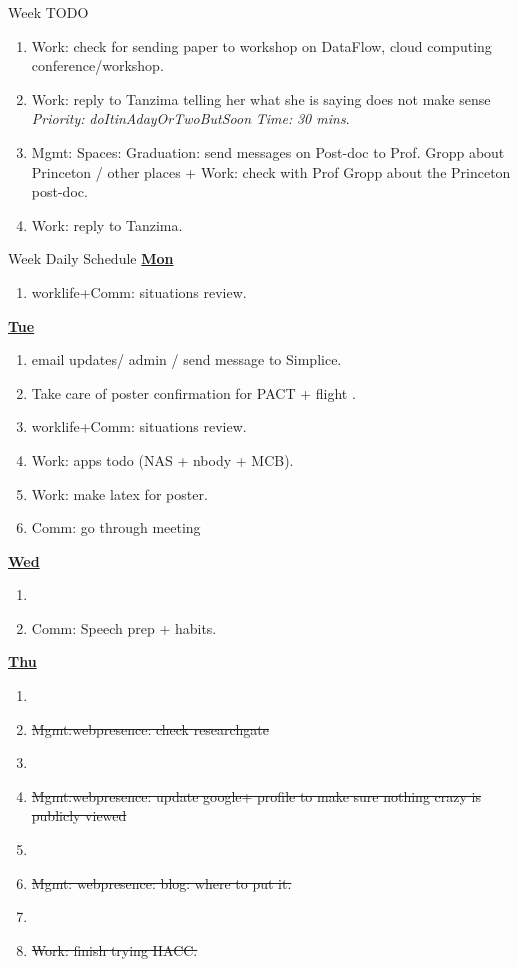 \documentclass[serif,mathserif,final]{beamer}
\newcommand{\doneTask}[1]{\item \sout{#1}}
\newcommand{\timeEst}[1]{\textit{Time:} \textit{#1}}
\newcommand{\priority}[1]{\textit{Priority:} \textit{#1}}
\begin{document}
\begin{frame}{}
\begin{columns}[t]
\begin{column}{0.50\linewidth}
\begin{block}{ Week TODO}
\begin{enumerate}
\item \tiny Work: check for sending paper to workshop on DataFlow,
  cloud computing conference/workshop. 
\item \tiny Work: reply to Tanzima telling her what she is saying does
  not make sense \priority{doItinAdayOrTwoButSoon} \timeEst{30 mins}.
\item \tiny Mgmt: Spaces: Graduation: send messages on Post-doc to
  Prof. Gropp about Princeton / other places + Work: check with Prof
  Gropp about the Princeton post-doc. 
\item \tiny Work: reply to Tanzima. 

\end{enumerate}
\end{block} 



\begin{block}{Week Daily Schedule} 
\textbf{\small \underline{Mon}}
\begin{enumerate} 
\tiny \item \tiny worklife+Comm: situations review. 
\end{enumerate} 

\textbf{\small \underline{Tue}}
\begin{enumerate} 
\tiny \item \tiny email updates/ admin / send message to Simplice. 
\item \tiny Take care of poster confirmation for PACT + flight . 
\item \tiny worklife+Comm: situations review.
\item \tiny Work: apps todo (NAS + nbody + MCB). 
\item \tiny Work: make latex for poster. 
\item \tiny Comm: go through meeting 
\end{enumerate} 

\textbf{\small {\underline{Wed}}}
\begin{enumerate} 
\tiny \item \tiny 
\item \tiny Comm: Speech prep + habits. 
\end{enumerate} 

\textbf{\small{\underline{Thu}}}
\begin{enumerate} 

\tiny \item \tiny \doneTask{Mgmt:webpresence: check researchgate}
\item \tiny \doneTask{Mgmt:webpresence: update google+ profile to make sure nothing crazy is publicly viewed} 
\item \tiny \doneTask{Mgmt: webpresence: blog: where to put it. } 
\tiny \item \tiny \doneTask{Work: finish trying  HACC. }


\end{enumerate}
\end{block}
\end{column}
\end{columns}
\end{frame}
\end{document}
